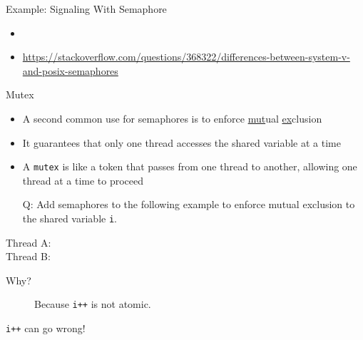 \begin{frame}{Example: Signaling With Semaphore}%
  \centering
\end{frame}

\begin{itemize}
\item {}
\item \url{https://stackoverflow.com/questions/368322/differences-between-system-v-and-posix-semaphores}
\end{itemize}

\begin{frame}
  \begin{block}{Mutex}
    \begin{itemize}
    \item A second common use for semaphores is to enforce \underline{mut}ual
      \underline{ex}clusion
    \item It guarantees that only one thread accesses the shared variable at a time
    \item A \texttt{mutex} is like a token that passes from one thread to another, allowing
      one thread at a time to proceed
    \end{itemize}
  \end{block}
  \begin{itemize}
  \item[Q:] Add semaphores to the following example to enforce mutual exclusion to the
    shared variable \texttt{i}.
  \end{itemize}
  \begin{multicols}{2}
    \begin{description}
    \item[Thread A:] 
    \item[Thread B:] 
    \end{description}
  \end{multicols}
  \begin{description}
  \item[Why?] Because \texttt{i++} is not atomic.
  \end{description}
\end{frame}

\begin{frame}{\texttt{i++} {\small can go wrong!}}
\end{frame}

